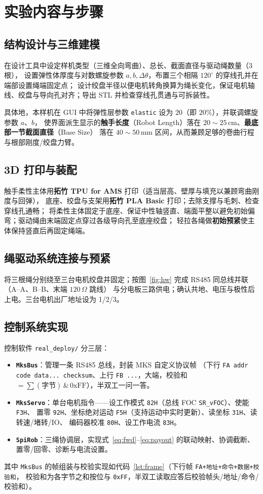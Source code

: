 \documentclass[12pt,a4paper]{ctexart}
\newcommand{\code}[1]{\texttt{#1}}
\begin{document}
\section{实验内容与步骤}

\subsection{结构设计与三维建模}
在设计工具中设定样机类型（三维全向弯曲）、总长、截面直径与驱动绳数量（3 根），
设置弹性体厚度与对数螺旋参数 $a,b,\Delta\theta$，布置三个相隔 $120^\circ$ 的穿线孔并在端部设置绳端固定点；
设计绞盘半径以便电机转角换算为绳长变化，保证电机轴线、绞盘与导向孔对齐；导出 STL 并检查穿线孔贯通与可拆装性。

具体地，本样机在 GUI 中将弹性层参数 \code{elastic} 设为 $20$（即 $20\%$），并联调螺旋参数 $a$、$b$，
使界面派生显示的\textbf{触手长度}（Robot Length）落在 $20\sim25\,$cm、\textbf{最底部一节截面直径}（Base Size）
落在 $40\sim50\,$mm 区间，从而兼顾足够的卷曲行程与根部刚度/绞盘力臂。

\subsection{3D 打印与装配}
触手柔性主体用\textbf{拓竹 TPU for AMS} 打印（适当层高、壁厚与填充以兼顾弯曲刚度与回弹），
底座、绞盘与支架用\textbf{拓竹 PLA Basic} 打印；去除支撑与毛刺、检查穿线孔通畅；
将柔性主体固定于底座、保证中性轴竖直、端面平整以避免初始偏弯；驱动绳由末端固定点穿过各级导向孔至底座绞盘；
轻拉各绳做\textbf{初始预紧}使主体保持竖直后再固定绳端。

\subsection{绳驱动系统连接与预紧}
将三根绳分别绕至三台电机绞盘并固定；按图~\ref{fig:hw} 完成 RS485 同总线并联（A--A、B--B、末端 $120\,\Omega$ 跳线）
与分电板三路供电；确认共地、电压与极性后上电。三台电机出厂地址设为 1/2/3。

\subsection{控制系统实现}
控制软件 \code{real\_deploy/} 分三层：
\begin{itemize}[leftmargin=2em]
  \item \textbf{\code{MksBus}}：管理一条 RS485 总线，封装 MKS 自定义协议帧
        （下行 \code{FA addr code data...\ checksum}、上行 \code{FB ...}，大端，校验和 $=\sum(\text{字节})\,\&\,\text{0xFF}$），半双工一问一答。
  \item \textbf{\code{MksServo}}：单台电机指令——设工作模式 \code{82H}（总线 FOC \code{SR\_vFOC}）、使能 \code{F3H}、
        置零 \code{92H}、坐标绝对运动 \code{F5H}（支持运动中实时更新）、读坐标 \code{31H}、读转速/堵转/IO、
        编码器校准 \code{80H}、设工作电流 \code{83H}。
  \item \textbf{\code{SpiRob}}：三绳协调层，实现式~\eqref{eq:fwd}--\eqref{eq:payout} 的联动映射、协调截断、置零/回零、诊断与电流设置。
\end{itemize}
其中 \code{MksBus} 的帧组装与校验实现如代码~\ref{lst:frame}（下行帧 \code{FA+地址+命令+数据+校验和}，
校验和为各字节之和按位与 \code{0xFF}，半双工读取应答后校验帧头/地址/命令/校验和）。
\end{document}
